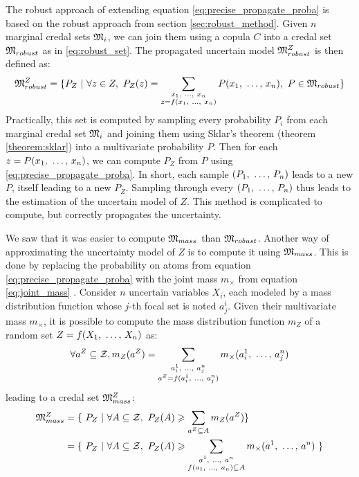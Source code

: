 The robust approach of extending equation \eqref{eq:precise_propagate_proba} is based on the robust approach from section \ref{sec:robust_method}. Given $n$ marginal credal sets ${\mathfrak{M}}_i$, we can join them using a copula $C$ into a credal set ${\mathfrak{M}}_{robust}$ as in \eqref{eq:robust_set}. The propagated uncertain model ${\mathfrak{M}}^Z_{robust}$ is then defined as:
\begin{align}
    {\mathfrak{M}}^Z_{robust} = \{P_Z~|~\forall z\in Z, ~P_Z(z)=\sum_{\substack{x_1 {, ~\dots, ~} x_n\\z=f(x_1 {, ~\dots, ~} x_n)}}P(x_1 {, ~\dots, ~} x_n), ~P\in{\mathfrak{M}}_{robust}\}
\end{align}
Practically, this set is computed by sampling every probability $P_i$ from each marginal credal set ${\mathfrak{M}}_i$ and joining them using Sklar's theorem (theorem \ref{theorem:sklar}) into a multivariate probability $P$. Then for each $z=P(x_1 {, ~\dots, ~} x_n)$, we can compute $P_Z$ from $P$ using \eqref{eq:precise_propagate_proba}. In short, each sample $(P_1 {, ~\dots, ~} P_n)$ leads to a new $P$, itself leading to a new $P_Z$. Sampling through every $(P_1 {, ~\dots, ~} P_n)$ thus leads to the estimation of the uncertain model of $Z$. This method is complicated to compute, but correctly propagates the uncertainty.

We saw that it was easier to compute ${\mathfrak{M}}_{mass}$ than ${\mathfrak{M}}_{robust}$. Another way of approximating the uncertainty model of $Z$ is to compute it using ${\mathfrak{M}}_{mass}$. This is done by replacing the probability on atoms from equation \eqref{eq:precise_propagate_proba} with the joint mass $m_\times$ from equation \eqref{eq:joint_mass} \cite{gray_dependent_2021}. Consider $n$ uncertain variables $X_i$, each modeled by a mass distribution function whose $j$-th focal set is noted $a^i_j$. Given their multivariate mass $m_\times$, it is possible to compute the mass distribution function $m_Z$ of a random set $Z=f(X_1 {, ~\dots, ~} X_n)$ as:
\begin{align}
    \forall a^Z\subseteq\mathcal{Z}, m_Z(a^Z) = \sum_{\substack{a^1_i {, ~\dots, ~} a^n_j\\a^Z=f(a^1_i {, ~\dots, ~}  a^n_j)}}m_\times(a^1_i {, ~\dots, ~} a^n_j)\label{eq:mass_propagated}
\end{align}
leading to a credal set ${\mathfrak{M}}_{mass}^Z$:
\begin{align}
    {\mathfrak{M}}_{mass}^Z &= \{~P_Z~|~\forall A\subseteq\mathcal{Z},~P_Z(A)\geqslant \sum_{a^Z\subseteq A}m_Z(a^Z)\}\\
    &=\{~P_Z~|~\forall A\subseteq\mathcal{Z},~P_Z(A)\geqslant \sum_{\substack{a^1{, ~\dots, ~} a^n \\ f(a_1{, ~\dots, ~} a_n)\subseteq A}}m_\times(a^1{, ~\dots, ~} a^n)~\}
\end{align}

